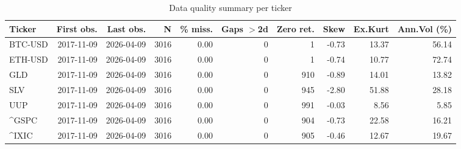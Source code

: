 \begin{table}[H]
\centering
\small
\caption{Data quality summary per ticker}
\label{tab:data_quality}
\begin{tabular}{lrrrrrrrrr}
\toprule
Ticker & First obs. & Last obs. & N & \% miss. & Gaps $>$2d & Zero ret. & Skew & Ex.Kurt & Ann.Vol (\%) \\
\midrule
BTC-USD & 2017-11-09 & 2026-04-09 & 3016 & 0.00 & 0 & 1 & -0.73 & 13.37 & 56.14 \\
ETH-USD & 2017-11-09 & 2026-04-09 & 3016 & 0.00 & 0 & 1 & -0.74 & 10.77 & 72.74 \\
GLD & 2017-11-09 & 2026-04-09 & 3016 & 0.00 & 0 & 910 & -0.89 & 14.01 & 13.82 \\
SLV & 2017-11-09 & 2026-04-09 & 3016 & 0.00 & 0 & 945 & -2.80 & 51.88 & 28.18 \\
UUP & 2017-11-09 & 2026-04-09 & 3016 & 0.00 & 0 & 991 & -0.03 & 8.56 & 5.85 \\
^GSPC & 2017-11-09 & 2026-04-09 & 3016 & 0.00 & 0 & 904 & -0.73 & 22.58 & 16.21 \\
^IXIC & 2017-11-09 & 2026-04-09 & 3016 & 0.00 & 0 & 905 & -0.46 & 12.67 & 19.67 \\
\bottomrule
\end{tabular}
\end{table}